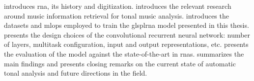 
introduces \gls{rna}, its history and digitization.
 introduces the relevant research around
music information retrieval for tonal music analysis.
 introduces the
datasets and \gls{mlops} employed to train the glspl{rna}
model presented in this thesis. 
presents the design choices of the convolutional recurrent
neural network: number of layers, multitask configuration,
input and output representations, etc.
 presents the evaluation of
the model against the state-of-the-art in \glspl{rna}.
 summarizes the main findings and
presents closing remarks on the current state of automatic
tonal analysis and future directions in the field.

